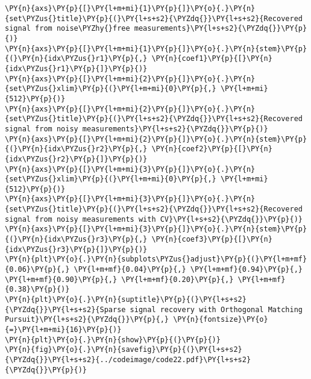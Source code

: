\begin{Verbatim}[commandchars=\\\{\}]
\PY{n}{axs}\PY{p}{[}\PY{l+m+mi}{1}\PY{p}{]}\PY{o}{.}\PY{n}{set\PYZus{}title}\PY{p}{(}\PY{l+s+s2}{\PYZdq{}}\PY{l+s+s2}{Recovered signal from noise\PYZhy{}free measurements}\PY{l+s+s2}{\PYZdq{}}\PY{p}{)}
\PY{n}{axs}\PY{p}{[}\PY{l+m+mi}{1}\PY{p}{]}\PY{o}{.}\PY{n}{stem}\PY{p}{(}\PY{n}{idx\PYZus{}r1}\PY{p}{,} \PY{n}{coef1}\PY{p}{[}\PY{n}{idx\PYZus{}r1}\PY{p}{]}\PY{p}{)}
\PY{n}{axs}\PY{p}{[}\PY{l+m+mi}{2}\PY{p}{]}\PY{o}{.}\PY{n}{set\PYZus{}xlim}\PY{p}{(}\PY{l+m+mi}{0}\PY{p}{,} \PY{l+m+mi}{512}\PY{p}{)}
\PY{n}{axs}\PY{p}{[}\PY{l+m+mi}{2}\PY{p}{]}\PY{o}{.}\PY{n}{set\PYZus{}title}\PY{p}{(}\PY{l+s+s2}{\PYZdq{}}\PY{l+s+s2}{Recovered signal from noisy measurements}\PY{l+s+s2}{\PYZdq{}}\PY{p}{)}
\PY{n}{axs}\PY{p}{[}\PY{l+m+mi}{2}\PY{p}{]}\PY{o}{.}\PY{n}{stem}\PY{p}{(}\PY{n}{idx\PYZus{}r2}\PY{p}{,} \PY{n}{coef2}\PY{p}{[}\PY{n}{idx\PYZus{}r2}\PY{p}{]}\PY{p}{)}
\PY{n}{axs}\PY{p}{[}\PY{l+m+mi}{3}\PY{p}{]}\PY{o}{.}\PY{n}{set\PYZus{}xlim}\PY{p}{(}\PY{l+m+mi}{0}\PY{p}{,} \PY{l+m+mi}{512}\PY{p}{)}
\PY{n}{axs}\PY{p}{[}\PY{l+m+mi}{3}\PY{p}{]}\PY{o}{.}\PY{n}{set\PYZus{}title}\PY{p}{(}\PY{l+s+s2}{\PYZdq{}}\PY{l+s+s2}{Recovered signal from noisy measurements with CV}\PY{l+s+s2}{\PYZdq{}}\PY{p}{)}
\PY{n}{axs}\PY{p}{[}\PY{l+m+mi}{3}\PY{p}{]}\PY{o}{.}\PY{n}{stem}\PY{p}{(}\PY{n}{idx\PYZus{}r3}\PY{p}{,} \PY{n}{coef3}\PY{p}{[}\PY{n}{idx\PYZus{}r3}\PY{p}{]}\PY{p}{)}
\PY{n}{plt}\PY{o}{.}\PY{n}{subplots\PYZus{}adjust}\PY{p}{(}\PY{l+m+mf}{0.06}\PY{p}{,} \PY{l+m+mf}{0.04}\PY{p}{,} \PY{l+m+mf}{0.94}\PY{p}{,} \PY{l+m+mf}{0.90}\PY{p}{,} \PY{l+m+mf}{0.20}\PY{p}{,} \PY{l+m+mf}{0.38}\PY{p}{)}
\PY{n}{plt}\PY{o}{.}\PY{n}{suptitle}\PY{p}{(}\PY{l+s+s2}{\PYZdq{}}\PY{l+s+s2}{Sparse signal recovery with Orthogonal Matching Pursuit}\PY{l+s+s2}{\PYZdq{}}\PY{p}{,} \PY{n}{fontsize}\PY{o}{=}\PY{l+m+mi}{16}\PY{p}{)}
\PY{n}{plt}\PY{o}{.}\PY{n}{show}\PY{p}{(}\PY{p}{)}
\PY{n}{fig}\PY{o}{.}\PY{n}{savefig}\PY{p}{(}\PY{l+s+s2}{\PYZdq{}}\PY{l+s+s2}{../codeimage/code22.pdf}\PY{l+s+s2}{\PYZdq{}}\PY{p}{)}
\end{Verbatim}

